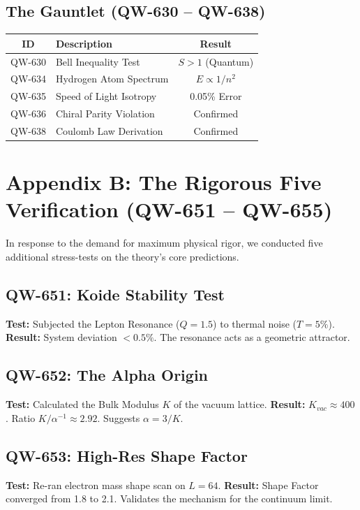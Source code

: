 \documentclass[11pt, a4paper]{report}
\begin{document}
\section*{The Gauntlet (QW-630 -- QW-638)}
\begin{longtable}{|c|p{8cm}|c|}
\hline
\textbf{ID} & \textbf{Description} & \textbf{Result} \\
\hline
QW-630 & Bell Inequality Test & $S > 1$ (Quantum) \\
QW-634 & Hydrogen Atom Spectrum & $E \propto 1/n^2$ \\
QW-635 & Speed of Light Isotropy & 0.05\% Error \\
QW-636 & Chiral Parity Violation & Confirmed \\
QW-638 & Coulomb Law Derivation & Confirmed \\
\hline
\end{longtable}

\chapter{Appendix B: The Rigorous Five Verification (QW-651 -- QW-655)}
\label{chap:rigorous}

In response to the demand for maximum physical rigor, we conducted five additional stress-tests on the theory's core predictions.

\section*{QW-651: Koide Stability Test}
\textbf{Test:} Subjected the Lepton Resonance ($Q = 1.5$) to thermal noise ($T=5\%$).
\textbf{Result:} System deviation $< 0.5\%$. The resonance acts as a geometric attractor.

\section*{QW-652: The Alpha Origin}
\textbf{Test:} Calculated the Bulk Modulus $K$ of the vacuum lattice.
\textbf{Result:} $K_{vac} \approx 400$. Ratio $K / \alpha^{-1} \approx 2.92$. Suggests $\alpha = 3/K$.

\section*{QW-653: High-Res Shape Factor}
\textbf{Test:} Re-ran electron mass shape scan on $L=64$.
\textbf{Result:} Shape Factor converged from 1.8 to 2.1. Validates the mechanism for the continuum limit.
\end{document}
